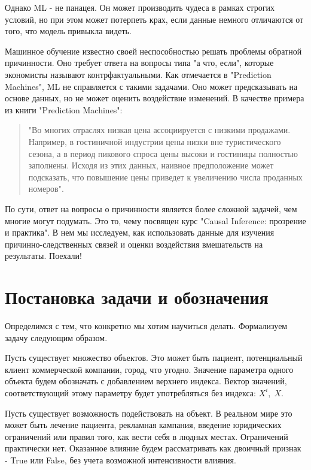 \documentclass{article}
\newcommand{\coursename}{Causal Inference: прозрение и практика}
\begin{document}
        Однако ML - не панацея. Он может производить чудеса в рамках строгих условий, но при этом может потерпеть крах, если данные немного отличаются от того, что модель привыкла видеть.


        Машинное обучение известно своей неспособностью решать проблемы обратной причинности. Оно требует ответа на вопросы типа "а что, если"{}, которые экономисты называют контрфактуальными. Как отмечается в "Prediction Machines"{}, ML не справляется с такими задачами. Оно может предсказывать на основе данных, но не может оценить воздействие изменений. В качестве примера из книги "Prediction Machines":

        \begin{quote}
            "Во многих отраслях низкая цена ассоциируется с низкими продажами. Например, в гостиничной индустрии цены низки вне туристического сезона, а в период пикового спроса цены высоки и гостиницы полностью заполнены. Исходя из этих данных, наивное предположение может подсказать, что повышение цены приведет к увеличению числа проданных номеров".
        \end{quote}

        По сути, ответ на вопросы о причинности является более сложной задачей, чем многие могут подумать. Это то, чему посвящен курс "\coursename". В нем мы исследуем, как использовать данные для изучения причинно-следственных связей и оценки воздействия вмешательств на результаты. Поехали!

    \section*{Постановка задачи и обозначения}

        Определимся с тем, что конкретно мы хотим научиться делать. Формализуем задачу следующим образом.

        Пусть существует множество объектов. Это может быть пациент, потенциальный клиент коммерческой компании, город, что угодно. Значение параметра одного объекта будем обозначать с добавлением верхнего индекса. Вектор значений, соответствующий этому параметру будет употребляться без индекса: $X^i,\; X$.

        Пусть существует возможность подействовать на объект. В реальном мире это может быть лечение пациента, рекламная кампания, введение юридических ограничений или правил того, как вести себя в людных местах. Ограничений практически нет. Оказанное влияние будем рассматривать как двоичный признак - True или False, без учета возможной интенсивности влияния.
\end{document}
